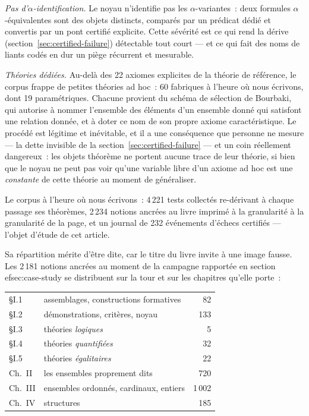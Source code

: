 \documentclass[11pt]{article}
\theoremstyle{remark}\newtheorem{example}{Exemple}
\begin{document}
\emph{Pas d'$\alpha$-identification.} Le noyau n'identifie pas les
$\alpha$-variantes~: deux formules $\alpha$-équivalentes sont des objets distincts,
comparés par un prédicat dédié et convertis par un pont certifié explicite. Cette
sévérité est ce qui rend la dérive (section~\ref{sec:certified-failure}) détectable
tout court --- et ce qui fait des noms de liants codés en dur un piège récurrent et
mesurable.

\emph{Théories dédiées.} Au-delà des 22 axiomes explicites de la théorie de référence,
le corpus frappe de petites théories ad hoc~: 60 fabriques à l'heure où nous écrivons,
dont 19 paramétriques.
Chacune provient du schéma de sélection de Bourbaki, qui autorise à nommer l'ensemble
des éléments d'un ensemble donné qui satisfont une relation donnée, et à doter ce nom
de son propre axiome caractéristique. Le procédé est légitime et inévitable, et il a
une conséquence que personne ne mesure --- la dette invisible de la
section~\ref{sec:certified-failure} --- et un coin réellement dangereux~: les objets
théorème ne portent aucune trace de leur théorie, si bien que le noyau ne peut pas
voir qu'une variable libre d'un axiome ad hoc est une \emph{constante} de cette
théorie au moment de généraliser.

Le corpus à l'heure où nous écrivons~: 4\,221 tests collectés re-dérivant à chaque
passage ses théorèmes, 2\,234 notions ancrées au livre imprimé à la granularité
à la granularité de la page, et un journal de 232 événements d'échecs certifiés --- l'objet d'étude
de cet article.

Sa répartition mérite d'être dite, car le titre du livre invite à une image fausse.
Les 2\,181 notions ancrées au moment de la campagne rapportée en
section~
ef{sec:case-study} se distribuent sur la tour et sur les chapitres qu'elle
porte~:

\begin{center}\small
\begin{tabular}{llr}
\toprule
\S I.1 & assemblages, constructions formatives & 82 \\
\S I.2 & démonstrations, critères, noyau & 133 \\
\S I.3 & théories \emph{logiques} & 5 \\
\S I.4 & théories \emph{quantifiées} & 32 \\
\S I.5 & théories \emph{égalitaires} & 22 \\
\midrule
Ch.~II & les ensembles proprement dits & 720 \\
Ch.~III & ensembles ordonnés, cardinaux, entiers & 1\,002 \\
Ch.~IV & structures & 185 \\
\bottomrule
\end{tabular}
\end{center}
\end{document}
